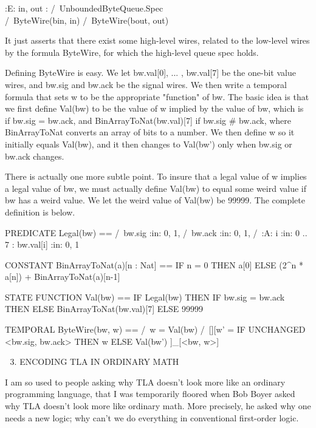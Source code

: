 \begin{spec}
    :E: in, out : /\ UnboundedByteQueue.Spec
\\                /\ ByteWire(bin, in) /\ ByteWire(bout, out)

It just asserts that there exist some high-level wires, related to
the low-level wires by the formula ByteWire, for which the
high-level queue spec holds.

Defining ByteWire is easy.  We let bw.val[0], ...  , bw.val[7] be
the one-bit value wires, and bw.sig and bw.ack be the signal wires.
We then write a temporal formula that sets w to be the appropriate
"function" of bw.  The basic idea is that we first define Val(bw) to
be the value of w implied by the value of bw, which is { } if bw.sig
= bw.ack, and {BinArrayToNat(bw.val)[7]} if bw.sig # bw.ack, where
BinArrayToNat converts an array of bits to a number.  We then define
w so it initially equals Val(bw), and it then changes to Val(bw')
only when bw.sig or bw.ack changes.

There is actually one more subtle point.  To insure that a legal
value of w implies a legal value of bw, we must actually define
Val(bw) to equal some weird value if bw has a weird value.  We let
the weird value of Val(bw) be {99999}.  The complete definition is
below.

   PREDICATE
     Legal(bw) == /\ bw.sig :in: {0, 1}, 
                  /\ bw.ack :in: {0, 1}, 
                  /\ :A: i :in: {0 .. 7} : bw.val[i] :in: {0, 1}

   CONSTANT
     BinArrayToNat(a)[n : Nat] == 
       IF n = 0 THEN a[0]
                ELSE (2^n * a[n]) + BinArrayToNat(a)[n-1]

   STATE FUNCTION
     Val(bw)  ==  IF Legal(bw)
                    THEN IF bw.sig = bw.ack
                           THEN { }
                           ELSE { BinArrayToNat(bw.val)[7] }
                    ELSE { 99999 }

   TEMPORAL
     ByteWire(bw, w) ==
         /\ w = Val(bw)
         /\ [][w' = IF UNCHANGED <bw.sig, bw.ack> THEN w
                                                  ELSE Val(bw')               
              ]_[<bw, w>]


3. ENCODING TLA IN ORDINARY MATH

I am so used to people asking why TLA doesn't look more like an
ordinary programming language, that I was temporarily floored when
Bob Boyer asked why TLA doesn't look more like ordinary math.  More
precisely, he asked why one needs a new logic; why can't we do
everything in conventional first-order logic.


\end{spec}
